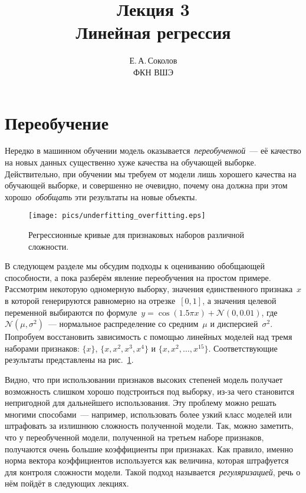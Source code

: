 \documentclass[12pt,fleqn]{article}
\begin{document}
\title{Лекция 3\\Линейная регрессия}
\author{Е.\,А.\,Соколов\\ФКН ВШЭ}
\maketitle

\section{Переобучение}

Нередко в машинном обучении модель оказывается~\emph{переобученной}~--- её качество
на новых данных существенно хуже качества на обучающей выборке.
Действительно, при обучении мы требуем от модели лишь хорошего качества на обучающей выборке,
и совершенно не очевидно, почему она должна при этом хорошо~\emph{обобщать} эти результаты
на новые объекты.

\begin{figure}[t]
    \centering
    \texttt{[image: pics/underfitting\_overfitting.eps]}
    \caption{Регрессионные кривые для признаковых наборов различной сложности.}
    \label{fig:overfitting}
\end{figure}

В следующем разделе мы обсудим подходы к оцениванию обобщающей способности,
а пока разберём явление переобучения на простом примере.
Рассмотрим некоторую одномерную выборку, значения единственного признака~$x$
в которой генерируются равномерно на отрезке~$[0, 1]$,
а значения целевой переменной выбираются по формуле~$y = \cos(1.5 \pi x) + \mathcal{N}(0, 0.01)$,
где~$\mathcal{N}(\mu, \sigma^2)$~--- нормальное распределение со средним~$\mu$ и дисперсией~$\sigma^2$.
Попробуем восстановить зависимость с помощью линейных моделей над тремя наборами признаков:
$\{x\}$, $\{x, x^2, x^3, x^4\}$ и $\{x, x^2, \dots, x^{15}\}$.
Соответствующие результаты представлены на рис.~\ref{fig:overfitting}.

Видно, что при использовании признаков высоких степеней модель получает возможность
слишком хорошо подстроиться под выборку, из-за чего становится непригодной для дальнейшего использования.
Эту проблему можно решать многими способами~--- например, использовать более узкий класс моделей
или штрафовать за излишнюю сложность полученной модели.
Так, можно заметить, что у переобученной модели, полученной на третьем наборе признаков,
получаются очень большие коэффициенты при признаках.
Как правило, именно норма вектора коэффициентов используется как величина,
которая штрафуется для контроля сложности модели.
Такой подход называется~\emph{регуляризацией}, речь о нём пойдёт в следующих лекциях.
\end{document}
